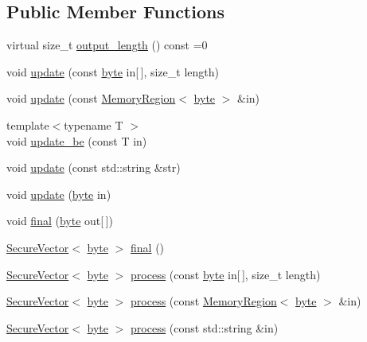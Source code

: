 \subsection*{Public Member Functions}
\begin{DoxyCompactItemize}
\item 
virtual size\-\_\-t \hyperlink{classBotan_1_1Buffered__Computation_a7b2e6776ea9ded2e3f9da5a760b7d34b}{output\-\_\-length} () const =0
\item 
void \hyperlink{classBotan_1_1Buffered__Computation_a5d0e98b9debb8732a77ae9e3b4dc1986}{update} (const \hyperlink{namespaceBotan_a7d793989d801281df48c6b19616b8b84}{byte} in\mbox{[}$\,$\mbox{]}, size\-\_\-t length)
\item 
void \hyperlink{classBotan_1_1Buffered__Computation_ab561300dae02c32840d0407e43f8ae0d}{update} (const \hyperlink{classBotan_1_1MemoryRegion}{Memory\-Region}$<$ \hyperlink{namespaceBotan_a7d793989d801281df48c6b19616b8b84}{byte} $>$ \&in)
\item 
{\footnotesize template$<$typename T $>$ }\\void \hyperlink{classBotan_1_1Buffered__Computation_a7f52cde604b5aef657f37293306b371a}{update\-\_\-be} (const T in)
\item 
void \hyperlink{classBotan_1_1Buffered__Computation_a02948aea88903f579f7e519932d8b9fc}{update} (const std\-::string \&str)
\item 
void \hyperlink{classBotan_1_1Buffered__Computation_aaf6d0fc0910a67d0d7f83c3e059ecc13}{update} (\hyperlink{namespaceBotan_a7d793989d801281df48c6b19616b8b84}{byte} in)
\item 
void \hyperlink{classBotan_1_1Buffered__Computation_a69a358a449e07aa76650a18c683230b0}{final} (\hyperlink{namespaceBotan_a7d793989d801281df48c6b19616b8b84}{byte} out\mbox{[}$\,$\mbox{]})
\item 
\hyperlink{classBotan_1_1SecureVector}{Secure\-Vector}$<$ \hyperlink{namespaceBotan_a7d793989d801281df48c6b19616b8b84}{byte} $>$ \hyperlink{classBotan_1_1Buffered__Computation_af2c62a00ad895aa7f142e345fd4585e4}{final} ()
\item 
\hyperlink{classBotan_1_1SecureVector}{Secure\-Vector}$<$ \hyperlink{namespaceBotan_a7d793989d801281df48c6b19616b8b84}{byte} $>$ \hyperlink{classBotan_1_1Buffered__Computation_a1096e777ce409385e0ab0c22ec9a36fe}{process} (const \hyperlink{namespaceBotan_a7d793989d801281df48c6b19616b8b84}{byte} in\mbox{[}$\,$\mbox{]}, size\-\_\-t length)
\item 
\hyperlink{classBotan_1_1SecureVector}{Secure\-Vector}$<$ \hyperlink{namespaceBotan_a7d793989d801281df48c6b19616b8b84}{byte} $>$ \hyperlink{classBotan_1_1Buffered__Computation_a49ff50c9ecd5de1780b5d6dd4466c77d}{process} (const \hyperlink{classBotan_1_1MemoryRegion}{Memory\-Region}$<$ \hyperlink{namespaceBotan_a7d793989d801281df48c6b19616b8b84}{byte} $>$ \&in)
\item 
\hyperlink{classBotan_1_1SecureVector}{Secure\-Vector}$<$ \hyperlink{namespaceBotan_a7d793989d801281df48c6b19616b8b84}{byte} $>$ \hyperlink{classBotan_1_1Buffered__Computation_a6a7954de5404ea2e86db5d45f858b932}{process} (const std\-::string \&in)
\end{DoxyCompactItemize}


